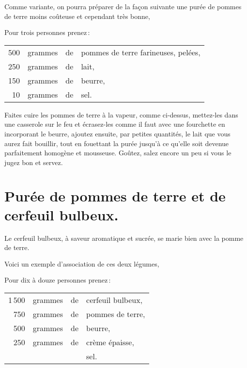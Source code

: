 \sk

Comme variante, on pourra préparer de la façon suivante une purée de pommes de
terre moins coûteuse et cependant très bonne,

\medskip

Pour trois personnes prenez :

\footnotesize
\begin{longtable}{rrrp{16em}}
    500 & grammes & de & pommes de terre farineuses, pelées,                                              \\
    250 & grammes & de & lait,                                                                            \\
    150 & grammes & de & beurre,                                                                          \\
     10 & grammes & de & sel.                                                                             \\
\end{longtable}
\normalsize

Faites cuire les pommes de terre à la vapeur, comme ci-dessus, mettez-les dans
une casserole sur le feu et écrasez-les comme il faut avec une fourchette en
incorporant le beurre, ajoutez ensuite, par petites quantités, le lait que vous
aurez fait bouillir, tout en fouettant la purée jusqu'à ce qu'elle soit devenue
parfaitement homogène et mousseuse. Goûtez, salez encore un peu si vous le
jugez bon et servez.

\section*{\centering Purée de pommes de terre et de cerfeuil bulbeux.}
{}

Le cerfeuil bulbeux, à saveur aromatique et sucrée, se marie bien avec la pomme
de terre.

\medskip

Voici un exemple d'association de ces deux légumes,

\medskip

Pour dix à douze personnes prenez :

\footnotesize
\begin{longtable}{rrrp{16em}}
  1 500 & grammes & de & cerfeuil bulbeux,                                                                \\
    750 & grammes & de & pommes de terre,                                                                 \\
    500 & grammes & de & beurre,                                                                          \\
    250 & grammes & de & crème épaisse,                                                                   \\
        &         &    & sel.                                                                             \\
\end{longtable}
\normalsize

